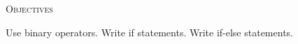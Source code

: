 
\textsc{Objectives}
 \begin{myenum}
   \li Use binary operators.
   \li Write if statements.
   \li Write if-else statements.
 \end{myenum}
 
